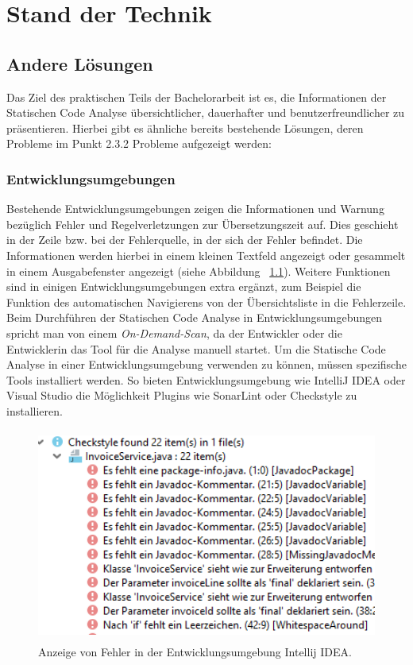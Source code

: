 
\chapter{Stand der Technik}
\section{Andere Lösungen}
Das Ziel des praktischen Teils der Bachelorarbeit ist es, die Informationen der Statischen Code Analyse übersichtlicher, dauerhafter und benutzerfreundlicher zu präsentieren. Hierbei gibt es ähnliche bereits bestehende Lösungen, deren Probleme im Punkt 2.3.2 Probleme aufgezeigt werden: 

\subsection{Entwicklungsumgebungen}
Bestehende Entwicklungsumgebungen zeigen die Informationen und Warnung bezüglich Fehler und Regelverletzungen zur Übersetzungszeit auf. Dies geschieht in der Zeile bzw. bei der Fehlerquelle, in der sich der Fehler befindet. Die Informationen werden hierbei in einem kleinen Textfeld angezeigt oder gesammelt in einem Ausgabefenster angezeigt  (siehe Abbildung ~\ref{fig:findingsInIDEA}). Weitere Funktionen  sind in einigen Entwicklungsumgebungen extra ergänzt, zum Beispiel die Funktion des automatischen Navigierens von der Übersichtsliste in die Fehlerzeile. Beim Durchführen der Statischen Code Analyse in Entwicklungsumgebungen spricht man von einem \textit{On-Demand-Scan}, da der Entwickler oder die Entwicklerin das Tool für die Analyse manuell startet. Um die Statische Code Analyse in einer Entwicklungsumgebung verwenden zu können, müssen spezifische Tools installiert werden. So bieten Entwicklungsumgebung wie IntelliJ IDEA oder Visual Studio die Möglichkeit Plugins wie SonarLint oder Checkstyle zu installieren. ~\parencite{sonarLint}
\begin{figure}[tp]
  \centering
  \includegraphics[height=7cm]{images/ideChecks.PNG}
 \caption[Anzeige von Fehler in der Entwicklungsumgebung Intellij IDEA]{Anzeige von Fehler in der Entwicklungsumgebung Intellij IDEA.}
  \label{fig:findingsInIDEA}
\end{figure}
